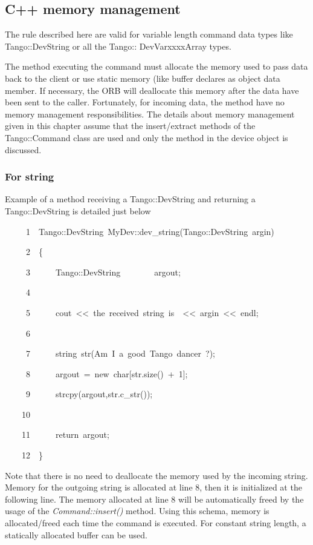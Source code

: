 \subsection{C++ memory management}

The rule described here are valid for variable length command data
types like Tango::DevString or all the Tango:: DevVarxxxxArray types.

The method executing the command must allocate the memory used to
pass data back to the client or use static memory (like buffer declares
as object data member. If necessary, the ORB will deallocate this
memory after the data have been sent to the caller. Fortunately, for
incoming data, the method have no memory management
responsibilities. The details about memory management given in this
chapter assume that the insert/extract methods of the Tango::Command
class are used and only the method in the device object is discussed.

\subsubsection{For string}

Example of a method receiving a Tango::DevString
and returning a Tango::DevString is detailed just below


\begin{lyxcode}
~~~~~1~~Tango::DevString~MyDev::dev\_string(Tango::DevString~argin)

~~~~~2~~\{

~~~~~3~~~~~~Tango::DevString~~~~~~~~argout;

~~~~~4~~

~~~~~5~~~~~~cout~<\textcompwordmark{}<~\textquotedbl{}the~received~string~is~\textquotedbl{}~<\textcompwordmark{}<~argin~<\textcompwordmark{}<~endl;

~~~~~6~~~~~~~~~~

~~~~~7~~~~~~string~str(\textquotedbl{}Am~I~a~good~Tango~dancer~?\textquotedbl{});

~~~~~8~~~~~~argout~=~new~char{[}str.size()~+~1{]};

~~~~~9~~~~~~strcpy(argout,str.c\_str());

~~~~10~~~~~~~~~~

~~~~11~~~~~~return~argout;

~~~~12~~\}
\end{lyxcode}


Note that there is no need to deallocate the memory used by the incoming
string. Memory for the outgoing string is allocated at line 8, then
it is initialized at the following line. The memory allocated at line
8 will be automatically freed by the usage of the \emph{Command::insert()}
method. Using this schema, memory is allocated/freed
each time the command is executed. For constant string length, a statically
allocated buffer can be used.

